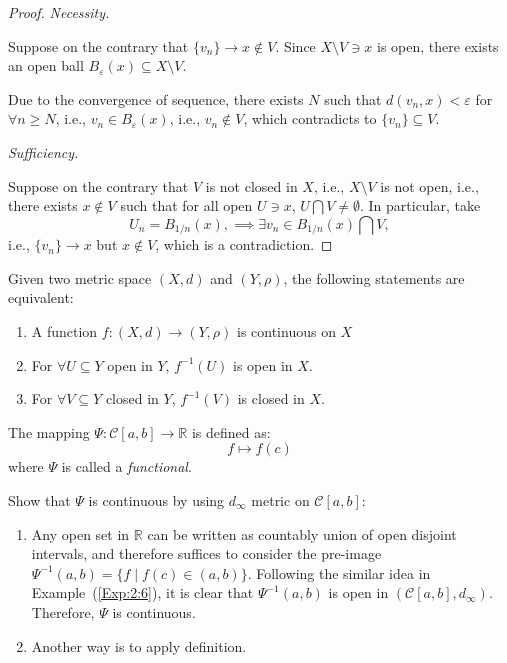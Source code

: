 \begin{proof}
\textit{Necessity.}

Suppose on the contrary that $\{v_n\}\to x\notin V$. Since $X\setminus V\ni x$ is open, there exists an open ball
$
B_\varepsilon(x)\subseteq X\setminus V.
$

Due to the convergence of sequence, there exists $N$ such that $d(v_n,x)<\varepsilon$ for $\forall n\ge N$, i.e., $v_n\in B_\varepsilon(x)$, i.e., $v_n\notin V$, which contradicts to $\{v_n\}\subseteq V$.

\textit{Sufficiency.}

Suppose on the contrary that $V$ is not closed in $X$, i.e., $X\setminus V$ is not open, i.e., there exists $x\notin V$ such that for all open $U\ni x$, $U\bigcap V\ne\emptyset$. In particular, take 
\[
U_n=B_{1/n}(x),\implies\exists v_n\in B_{1/n}(x)\bigcap V,
\]
i.e., $\{v_n\}\to x$ but $x\notin V$, which is a contradiction.
\end{proof}

\begin{proposition}\label{Pro:2:5}
Given two metric space $(X,d)$ and $(Y,\rho)$, the following statements are equivalent:
\begin{enumerate}
\item
A function $f:(X,d)\to(Y,\rho)$ is continuous on $X$
\item
For $\forall U\subseteq Y$ open in $Y$, $f^{-1}(U)$ is open in $X$.
\item
For $\forall V\subseteq Y$ closed in $Y$, $f^{-1}(V)$ is closed in $X$.
\end{enumerate}
\end{proposition}

\begin{example}
The mapping $\Psi:\mathcal{C}[a,b]\to\mathbb{R}$ is defined as:
\[
f\mapsto f(c)
\]
where $\Psi$ is called a \emph{functional}. 

Show that $\Psi$ is continuous by using $d_\infty$ metric on $\mathcal{C}[a,b]$:
\begin{enumerate}
\item
Any open set in $\mathbb{R}$ can be written as countably union of open disjoint intervals, and therefore suffices to consider the pre-image $\Psi^{-1}(a,b)=\{f\mid f(c)\in(a,b)\}$. Following the similar idea in Example~(\ref{Exp:2:6}), it is clear that $\Psi^{-1}(a,b)$ is open in $(\mathcal{C}[a,b],d_\infty)$. Therefore, $\Psi$ is continuous. 
\item
Another way is to apply definition.
\end{enumerate}
\end{example}

